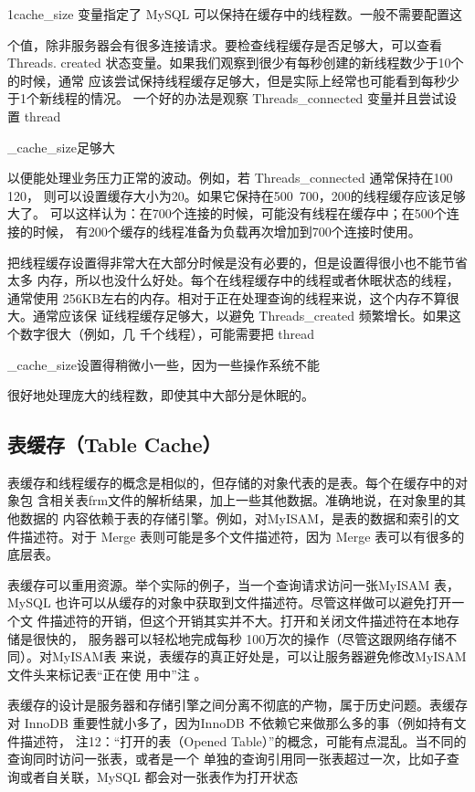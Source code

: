 1cache\_size 变量指定了 MySQL 可以保持在缓存中的线程数。一般不需要配置这

个值，除非服务器会有很多连接请求。要检查线程缓存是否足够大，可以查看 Threads.
created 状态变量。如果我们观察到很少有每秒创建的新线程数少于10个的时候，通常
应该尝试保持线程缓存足够大，但是实际上经常也可能看到每秒少于1个新线程的情况。
一个好的办法是观察 Threads\_connected 变量并且尝试设置 thread

\_cache\_size足够大

以便能处理业务压力正常的波动。例如，若 Threads\_connected 通常保持在100~ 120，
则可以设置缓存大小为20。如果它保持在500~700，200的线程缓存应该足够大了。
可以这样认为：在700个连接的时候，可能没有线程在缓存中；在500个连接的时候，
有200个缓存的线程准备为负载再次增加到700个连接时使用。

把线程缓存设置得非常大在大部分时候是没有必要的，但是设置得很小也不能节省太多
内存，所以也没什么好处。每个在线程缓存中的线程或者休眠状态的线程，通常使用
256KB左右的内存。相对于正在处理查询的线程来说，这个内存不算很大。通常应该保
证线程缓存足够大，以避免 Threads\_created 频繁增长。如果这个数字很大（例如，几
千个线程），可能需要把 thread

\_cache\_size设置得稍微小一些，因为一些操作系统不能

很好地处理庞大的线程数，即使其中大部分是休眠的。

\subsection{表缓存（Table Cache）}
表缓存和线程缓存的概念是相似的，但存储的对象代表的是表。每个在缓存中的对象包
含相关表frm文件的解析结果，加上一些其他数据。准确地说，在对象里的其他数据的
内容依赖于表的存储引擎。例如，对MyISAM，是表的数据和索引的文件描述符。对于
Merge 表则可能是多个文件描述符，因为 Merge 表可以有很多的底层表。

表缓存可以重用资源。举个实际的例子，当一个查询请求访问一张MyISAM 表，
MySQL 也许可以从缓存的对象中获取到文件描述符。尽管这样做可以避免打开一个文
件描述符的开销，但这个开销其实并不大。打开和关闭文件描述符在本地存储是很快的，
服务器可以轻松地完成每秒 100万次的操作（尽管这跟网络存储不同）。对MyISAM表
来说，表缓存的真正好处是，可以让服务器避免修改MyISAM 文件头来标记表“正在使
用中”注 。

表缓存的设计是服务器和存储引擎之间分离不彻底的产物，属于历史问题。表缓存对
InnoDB 重要性就小多了，因为InnoDB 不依赖它来做那么多的事（例如持有文件描述符，
注12：“打开的表（Opened Table）”的概念，可能有点混乱。当不同的查询同时访问一张表，或者是一个
单独的查询引用同一张表超过一次，比如子查询或者自关联，MySQL 都会对一张表作为打开状态

